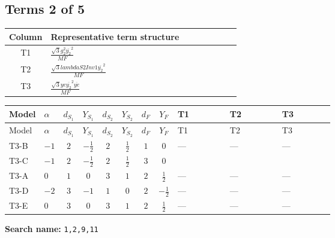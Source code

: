 \documentclass[8pt]{article}
\begin{document}
\begin{landscape}
\subsection*{Terms 2 of 5}
\begin{center}
\begin{tabular}{@{}c >{\raggedright\arraybackslash}p{0.82\linewidth}@{}}
\toprule
Column & Representative term structure \\
\midrule
T1 & \(\displaystyle \frac{\sqrt{3} g_{2}^{2} \overline{y_{2}}^{2}}{MF}\) \\
\midrule
T2 & \(\displaystyle \frac{\sqrt{3} lambdaS2Inv1 \overline{y_{2}}^{2}}{MF}\) \\
\midrule
T3 & \(\displaystyle \frac{\sqrt{3} ye \overline{y_{2}}^{2} \overline{ye}}{MF}\) \\
\midrule
\bottomrule
\end{tabular}
\end{center}
\smallskip
\tiny
\begin{longtable}{@{}llcccccc >{\raggedright\arraybackslash}p{0.21\linewidth} >{\raggedright\arraybackslash}p{0.21\linewidth} >{\raggedright\arraybackslash}p{0.21\linewidth}@{}}
\toprule
Model & $\alpha$ & $d_{S_1}$ & $Y_{S_1}$ & $d_{S_2}$ & $Y_{S_2}$ & $d_F$ & $Y_F$ & T1 & T2 & T3 \\
\midrule
\endfirsthead
\toprule
Model & $\alpha$ & $d_{S_1}$ & $Y_{S_1}$ & $d_{S_2}$ & $Y_{S_2}$ & $d_F$ & $Y_F$ & T1 & T2 & T3 \\
\midrule
\endhead
T3-B & $-1$ & $2$ & $-\frac{1}{2}$ & $2$ & $\frac{1}{2}$ & $1$ & $0$ & --- & --- & --- \\
\midrule
T3-C & $-1$ & $2$ & $-\frac{1}{2}$ & $2$ & $\frac{1}{2}$ & $3$ & $0$ & \scriptsize\adjustbox{max width=\linewidth}{$\begin{gathered} \frac{\sqrt{3} g_{2}^{2} \overline{y_{2}}^{2}}{8 MF}\end{gathered}$} & \scriptsize\adjustbox{max width=\linewidth}{$\begin{gathered} \frac{\sqrt{3} lambdaS2Inv1 \overline{y_{2}}^{2}}{12 MF}\end{gathered}$} & \scriptsize\adjustbox{max width=\linewidth}{$\begin{gathered} - \frac{\sqrt{3} ye \overline{y_{2}}^{2} \overline{ye}}{24 MF}\end{gathered}$} \\
\midrule
T3-A & $0$ & $1$ & $0$ & $3$ & $1$ & $2$ & $\frac{1}{2}$ & --- & --- & --- \\
\midrule
T3-D & $-2$ & $3$ & $-1$ & $1$ & $0$ & $2$ & $-\frac{1}{2}$ & --- & --- & --- \\
\midrule
T3-E & $0$ & $3$ & $0$ & $3$ & $1$ & $2$ & $\frac{1}{2}$ & --- & --- & --- \\
\midrule
\bottomrule
\end{longtable}
\clearpage
\noindent\textbf{Search name: }\texttt{1,2,9,11}\par\smallskip

\end{landscape}
\end{document}
